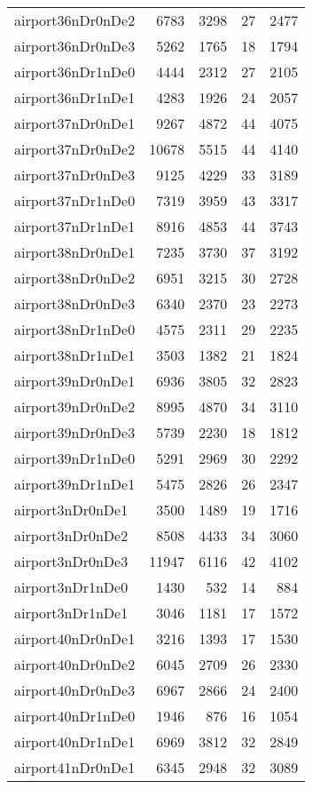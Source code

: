 \begin{longtable}{lrrrr}
airport36nDr0nDe2 & 6783 & 3298 & 27 & 2477 \\
airport36nDr0nDe3 & 5262 & 1765 & 18 & 1794 \\
airport36nDr1nDe0 & 4444 & 2312 & 27 & 2105 \\
airport36nDr1nDe1 & 4283 & 1926 & 24 & 2057 \\
airport37nDr0nDe1 & 9267 & 4872 & 44 & 4075 \\
airport37nDr0nDe2 & 10678 & 5515 & 44 & 4140 \\
airport37nDr0nDe3 & 9125 & 4229 & 33 & 3189 \\
airport37nDr1nDe0 & 7319 & 3959 & 43 & 3317 \\
airport37nDr1nDe1 & 8916 & 4853 & 44 & 3743 \\
airport38nDr0nDe1 & 7235 & 3730 & 37 & 3192 \\
airport38nDr0nDe2 & 6951 & 3215 & 30 & 2728 \\
airport38nDr0nDe3 & 6340 & 2370 & 23 & 2273 \\
airport38nDr1nDe0 & 4575 & 2311 & 29 & 2235 \\
airport38nDr1nDe1 & 3503 & 1382 & 21 & 1824 \\
airport39nDr0nDe1 & 6936 & 3805 & 32 & 2823 \\
airport39nDr0nDe2 & 8995 & 4870 & 34 & 3110 \\
airport39nDr0nDe3 & 5739 & 2230 & 18 & 1812 \\
airport39nDr1nDe0 & 5291 & 2969 & 30 & 2292 \\
airport39nDr1nDe1 & 5475 & 2826 & 26 & 2347 \\
airport3nDr0nDe1 & 3500 & 1489 & 19 & 1716 \\
airport3nDr0nDe2 & 8508 & 4433 & 34 & 3060 \\
airport3nDr0nDe3 & 11947 & 6116 & 42 & 4102 \\
airport3nDr1nDe0 & 1430 & 532 & 14 & 884 \\
airport3nDr1nDe1 & 3046 & 1181 & 17 & 1572 \\
airport40nDr0nDe1 & 3216 & 1393 & 17 & 1530 \\
airport40nDr0nDe2 & 6045 & 2709 & 26 & 2330 \\
airport40nDr0nDe3 & 6967 & 2866 & 24 & 2400 \\
airport40nDr1nDe0 & 1946 & 876 & 16 & 1054 \\
airport40nDr1nDe1 & 6969 & 3812 & 32 & 2849 \\
airport41nDr0nDe1 & 6345 & 2948 & 32 & 3089 \\

\end{longtable}
